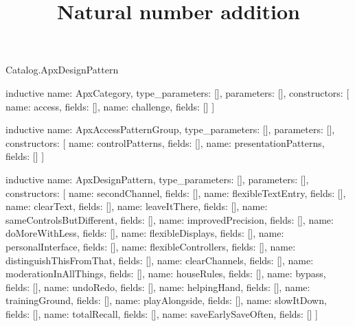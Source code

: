 \begin{lexlean}{Catalog.ApxDesignPattern}
\title{Natural number addition}
\begin{semanticmodule}
inductive{
  name: ApxCategory,
  type_parameters: [],
  parameters: [],
  constructors: [
    {name: access, fields: []},
    {name: challenge, fields: []}
  ]
}

inductive{
  name: ApxAccessPatternGroup,
  type_parameters: [],
  parameters: [],
  constructors: [
    {name: controlPatterns, fields: []},
    {name: presentationPatterns, fields: []}
  ]
}

inductive{
  name: ApxDesignPattern,
  type_parameters: [],
  parameters: [],
  constructors: [
    {name: secondChannel, fields: []},
    {name: flexibleTextEntry, fields: []},
    {name: clearText, fields: []},
    {name: leaveItThere, fields: []},
    {name: sameControlsButDifferent, fields: []},
    {name: improvedPrecision, fields: []},
    {name: doMoreWithLess, fields: []},
    {name: flexibleDisplays, fields: []},
    {name: personalInterface, fields: []},
    {name: flexibleControllers, fields: []},
    {name: distinguishThisFromThat, fields: []},
    {name: clearChannels, fields: []},
    {name: moderationInAllThings, fields: []},
    {name: houseRules, fields: []},
    {name: bypass, fields: []},
    {name: undoRedo, fields: []},
    {name: helpingHand, fields: []},
    {name: trainingGround, fields: []},
    {name: playAlongside, fields: []},
    {name: slowItDown, fields: []},
    {name: totalRecall, fields: []},
    {name: saveEarlySaveOften, fields: []}
  ]
}
\end{semanticmodule}
\end{lexlean}
